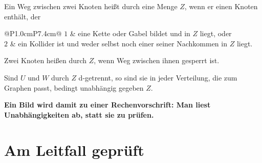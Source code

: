 \begin{definition}
Ein Weg zwischen zwei Knoten heißt  durch eine Menge $Z$, wenn er einen Knoten enthält, der
\begin{center}
{\small
\renewcommand{\arraystretch}{1.5}
\begin{tabular}{@{}P{1.0cm}P{7.4cm}@{}}
\toprule
$1$ & eine Kette oder Gabel bildet und in $Z$ liegt, \quad oder\\
$2$ & ein Kollider ist und weder selbst noch einer seiner Nachkommen in $Z$ liegt.\\
\bottomrule
\end{tabular}}
\end{center}
Zwei Knoten heißen  durch $Z$, wenn  Weg zwischen ihnen gesperrt ist.
\end{definition}

\begin{merksatz}
Sind $U$ und $W$ durch $Z$ d-getrennt, so sind sie in jeder Verteilung, die zum Graphen passt, bedingt unabhängig gegeben $Z$.

\begin{center}
\begin{minipage}{0.88\textwidth}
\end{minipage}
\end{center}

\begin{center}
\begin{minipage}{0.9\textwidth}
\textbf{Ein Bild wird damit zu einer Rechenvorschrift: Man liest Unabhängigkeiten ab, statt sie zu prüfen.}
\end{minipage}
\end{center}
\end{merksatz}

\section{Am Leitfall geprüft}

